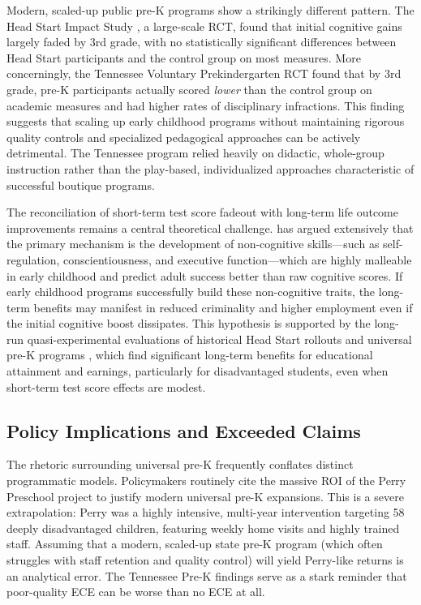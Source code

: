 \documentclass[12pt,letterpaper]{article}
\begin{document}
Modern, scaled-up public pre-K programs show a strikingly different pattern. The Head Start Impact Study \citep{puma2010}, a large-scale RCT, found that initial cognitive gains largely faded by 3rd grade, with no statistically significant differences between Head Start participants and the control group on most measures. More concerningly, the Tennessee Voluntary Prekindergarten RCT \citep{lipsey2018} found that by 3rd grade, pre-K participants actually scored \textit{lower} than the control group on academic measures and had higher rates of disciplinary infractions. This finding suggests that scaling up early childhood programs without maintaining rigorous quality controls and specialized pedagogical approaches can be actively detrimental. The Tennessee program relied heavily on didactic, whole-group instruction rather than the play-based, individualized approaches characteristic of successful boutique programs.

The reconciliation of short-term test score fadeout with long-term life outcome improvements remains a central theoretical challenge. \citet{heckman2006} has argued extensively that the primary mechanism is the development of non-cognitive skills---such as self-regulation, conscientiousness, and executive function---which are highly malleable in early childhood and predict adult success better than raw cognitive scores. If early childhood programs successfully build these non-cognitive traits, the long-term benefits may manifest in reduced criminality and higher employment even if the initial cognitive boost dissipates. This hypothesis is supported by the long-run quasi-experimental evaluations of historical Head Start rollouts \citep{bailey2021} and universal pre-K programs \citep{cascio2013}, which find significant long-term benefits for educational attainment and earnings, particularly for disadvantaged students, even when short-term test score effects are modest.

\subsection{Policy Implications and Exceeded Claims}

The rhetoric surrounding universal pre-K frequently conflates distinct programmatic models. Policymakers routinely cite the massive ROI of the Perry Preschool project to justify modern universal pre-K expansions. This is a severe extrapolation: Perry was a highly intensive, multi-year intervention targeting 58 deeply disadvantaged children, featuring weekly home visits and highly trained staff. Assuming that a modern, scaled-up state pre-K program (which often struggles with staff retention and quality control) will yield Perry-like returns is an analytical error. The Tennessee Pre-K findings \citep{lipsey2018} serve as a stark reminder that poor-quality ECE can be worse than no ECE at all.
\end{document}

